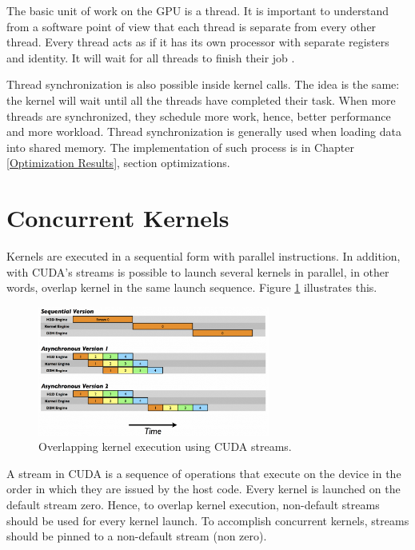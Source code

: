 The basic unit of work on the GPU is a thread. It is important to understand from a software point of view that each thread is separate from every other thread. Every thread acts as if it has its own processor with separate registers and identity. It will wait for all threads to finish their job \cite{design}.

Thread synchronization is also possible inside kernel calls. The idea is the same: the kernel will wait until all the threads have completed their task. When more threads are synchronized, they schedule more work, hence, better performance and more workload. Thread synchronization is generally used when loading data into shared memory. The implementation of such process is in Chapter \ref{Optimization Results}, section optimizations. 

\section{Concurrent Kernels}

Kernels are executed in a sequential form with parallel instructions. In addition, with CUDA's streams is possible to launch several kernels in parallel, in other words, overlap kernel in the same launch sequence. Figure \ref{fig:streams} illustrates this.

\begin{figure}[htbp]
	\centering
		\includegraphics[width=0.68\textwidth]{Figures/streams.png}
		\smallskip
	\caption[Concurrent kernels]{Overlapping kernel execution using CUDA streams.}
	\label{fig:streams}
\end{figure}

A stream in CUDA is a sequence of operations that execute on the device in the order in which they are issued by the host code. Every kernel is launched on the default stream zero. Hence, to overlap kernel execution, non-default streams should be used for every kernel launch. To accomplish concurrent kernels, streams should be pinned to a non-default stream (non zero)\cite{hwu}. 

